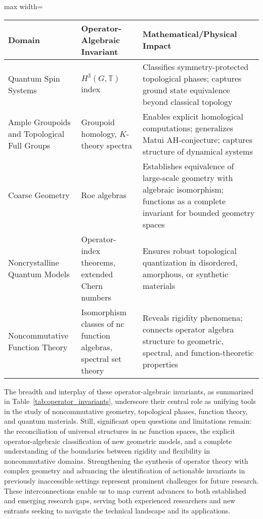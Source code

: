 \documentclass[sigconf]{acmart}
\begin{document}
\begin{table*}[htbp]
\centering
\caption{Summary of Key Operator-Algebraic Invariants across Topics}
\label{tab:operator_invariants}
\begin{adjustbox}{max width=\textwidth}
\begin{tabular}{lll}
\toprule
\textbf{Domain} & \textbf{Operator-Algebraic Invariant} & \textbf{Mathematical/Physical Impact} \\
\midrule
Quantum Spin Systems     & $H^3(G, \mathbb{T})$ index & Classifies symmetry-protected topological phases; captures ground state equivalence beyond classical topology \\
Ample Groupoids and Topological Full Groups & Groupoid homology, $K$-theory spectra & Enables explicit homological computations; generalizes Matui AH-conjecture; captures structure of dynamical systems \\
Coarse Geometry         & Roe algebras              & Establishes equivalence of large-scale geometry with algebraic isomorphism; functions as a complete invariant for bounded geometry spaces \\
Noncrystalline Quantum Models & Operator-index theorems, extended Chern numbers & Ensures robust topological quantization in disordered, amorphous, or synthetic materials \\
Noncommutative Function Theory & Isomorphism classes of nc function algebras, spectral set theory & Reveals rigidity phenomena; connects operator algebra structure to geometric, spectral, and function-theoretic properties \\
\bottomrule
\end{tabular}
\end{adjustbox}
\end{table*}

The breadth and interplay of these operator-algebraic invariants, as summarized in Table~\ref{tab:operator_invariants}, underscore their central role as unifying tools in the study of noncommutative geometry, topological phases, function theory, and quantum materials. Still, significant open questions and limitations remain: the reconciliation of universal structures in nc function spaces, the explicit operator-algebraic classification of new geometric models, and a complete understanding of the boundaries between rigidity and flexibility in noncommutative domains. Strengthening the synthesis of operator theory with complex geometry and advancing the identification of actionable invariants in previously inaccessible settings represent prominent challenges for future research. These interconnections enable us to map current advances to both established and emerging research gaps, serving both experienced researchers and new entrants seeking to navigate the technical landscape and its applications.
\end{document}
